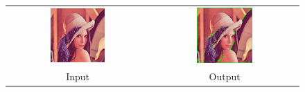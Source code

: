 \documentclass{beamer}
\begin{document}
\begin{frame}

\end{frame}

\begin{frame}

\end{frame}

\begin{frame}
\begin{figure}\centering
\begin{tabular}{cc}
\includegraphics[width=0.4\textwidth]{examples/reduce/lena} &
\includegraphics[width=0.4\textwidth]{examples/reduce/output_example6} \\
Input & Output
\end{tabular}
\end{figure}
\end{frame}

\begin{frame}

\end{frame}
\end{document}
